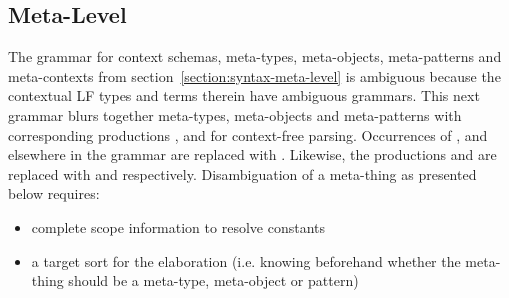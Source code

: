 \documentclass[11pt]{article}
\newcommand{\LF}{\textsc{LF}\xspace}
\begin{document}
\subsection{Meta-Level}

The grammar for context schemas, meta-types, meta-objects, meta-patterns and meta-contexts from section~\ref{section:syntax-meta-level} is ambiguous because the contextual \LF types and terms therein have ambiguous grammars.
This next grammar blurs together meta-types, meta-objects and meta-patterns with corresponding productions ,  and  for context-free parsing.
Occurrences of ,  and  elsewhere in the grammar are replaced with .
Likewise, the productions  and  are replaced with  and  respectively.
Disambiguation of a meta-thing as presented below requires:
\begin{itemize}
\item complete scope information to resolve constants
\item a target sort for the elaboration (i.e. knowing beforehand whether the meta-thing should be a meta-type, meta-object or pattern)
\end{itemize}
\end{document}
